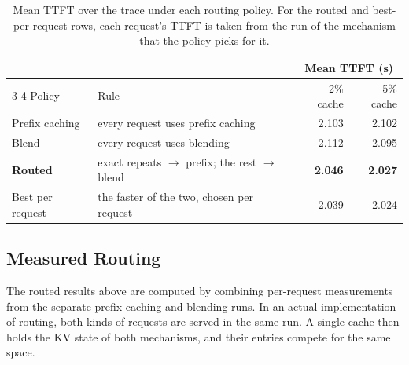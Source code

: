 \begin{table}[H]
  \centering
  \small
  \begin{tabular}{@{}llrr@{}}
    \toprule
    & & \multicolumn{2}{c}{Mean TTFT (s)} \\
    \cmidrule(l){3-4}
    Policy & Rule & 2\% cache & 5\% cache \\
    \midrule
    Prefix caching   & every request uses prefix caching                 & 2.103 & 2.102 \\
    Blend            & every request uses blending                       & 2.112 & 2.095 \\
    \textbf{Routed}  & exact repeats $\rightarrow$ prefix; the rest $\rightarrow$ blend & \textbf{2.046} & \textbf{2.027} \\
    Best per request & the faster of the two, chosen per request         & 2.039 & 2.024 \\
    \bottomrule
  \end{tabular}
  \caption{\small Mean TTFT over the trace under each routing policy. For the routed and best-per-request rows, each request's TTFT is taken from the run of the mechanism that the policy picks for it.}
  \label{tab:routing}
\end{table}

\subsection{Measured Routing}
\label{sec:rec_measured}

The routed results above are computed by combining per-request measurements from the separate prefix caching and blending runs. In an actual implementation of routing, both kinds of requests are served in the same run. A single cache then holds the KV state of both mechanisms, and their entries compete for the same space.

